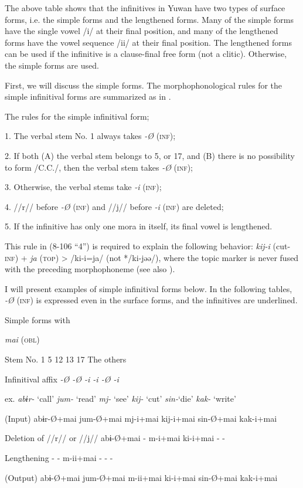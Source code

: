 The above table shows that the infinitives in Yuwan have two types of surface forms, i.e. the simple forms and the lengthened forms. Many of the simple forms have the single vowel /i/ at their final position, and many of the lengthened forms have the vowel sequence /ii/ at their final position. The lengthened forms can be used if the infinitive is a clause-final free form (not a clitic). Otherwise, the simple forms are used.

  First, we will discuss the simple forms. The morphophonological rules for the simple infinitival forms are summarized as in .

\ea\label{ex:8-106}
  The rules for the simple infinitival form;

  1.  The verbal stem No. 1 always takes \textit{-Ø} (\textsc{inf});

  2.  If both (A) the verbal stem belongs to 5, or 17, and (B) there is no possibility to form /C.C./, then the verbal stem takes \textit{-Ø} (\textsc{inf});

  3.  Otherwise, the verbal stems take \textit{-i} (\textsc{inf});

  4.  //r// before \textit{-Ø} (\textsc{inf}) and //j// before \textit{-i} (\textsc{inf}) are deleted;

  5.  If the infinitive has only one mora in itself, its final vowel is lengthened.
\z

This rule in (8-106 “4”) is required to explain the following behavior: \textit{kij-i} (cut-\textsc{inf}) + \textit{ja} (\textsc{top}) > /ki-i=ja/ (not */ki-jəə/), where the topic marker is never fused with the preceding morphophoneme (see also ).

I will present examples of simple infinitival forms below. In the following tables, \textit{-Ø} (\textsc{inf}) is expressed even in the surface forms, and the infinitives are underlined.

\begin{table}
\caption{\label{tab:key:81}Simple forms with}\textmd{ \textit{mai}}\textmd{ (\textsc{obl})}

Stem No.  1  5  12  13  17  The others

Infinitival affix  \textit{-Ø  -Ø  -i  -i  -Ø  -i}

ex.  \textit{abɨr-} ‘call’  \textit{jum-} ‘read’  \textit{mj-} ‘see’  \textit{kij-} ‘cut’  \textit{sin-}‘die’  \textit{kak-} ‘write’

(Input)  abɨr-Ø+mai  jum-Ø+mai  mj-i+mai  kij-i+mai  sin-Ø+mai  kak-i+mai

Deletion of //r// or //j//  abɨ-Ø+mai  -  m-i+mai  ki-i+mai  -  -

Lengthening  -  -  m-ii+mai  -  -  -

(Output)  abɨ-Ø+mai  jum-Ø+mai  m-ii+mai  ki-i+mai  sin-Ø+mai  kak-i+mai
\end{table}

